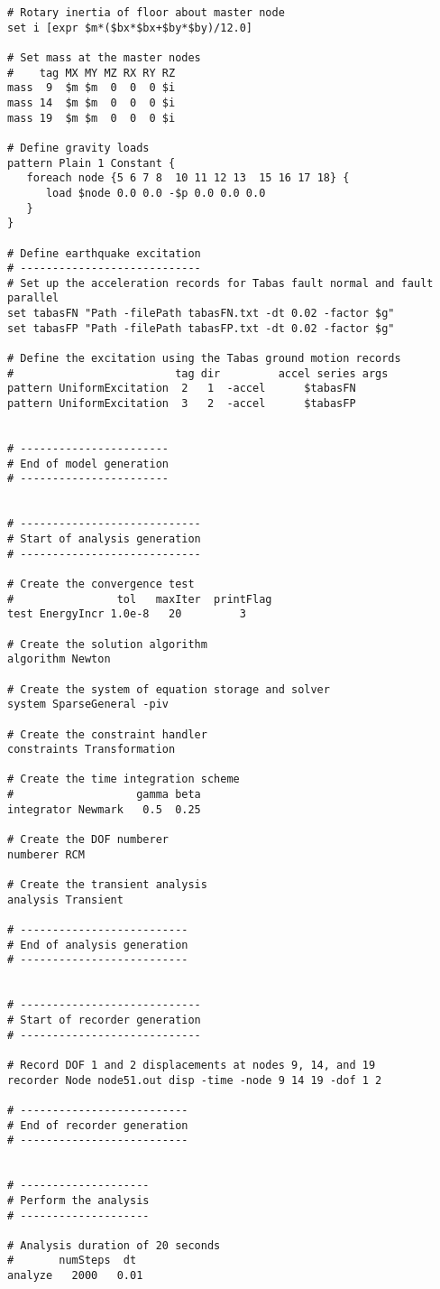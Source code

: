\documentclass[12pt]{article}
\begin{document}
{\begin{verbatim}
# Rotary inertia of floor about master node
set i [expr $m*($bx*$bx+$by*$by)/12.0]

# Set mass at the master nodes
#    tag MX MY MZ RX RY RZ
mass  9  $m $m  0  0  0 $i
mass 14  $m $m  0  0  0 $i
mass 19  $m $m  0  0  0 $i

# Define gravity loads
pattern Plain 1 Constant {
   foreach node {5 6 7 8  10 11 12 13  15 16 17 18} {
      load $node 0.0 0.0 -$p 0.0 0.0 0.0
   }
}

# Define earthquake excitation
# ----------------------------
# Set up the acceleration records for Tabas fault normal and fault parallel
set tabasFN "Path -filePath tabasFN.txt -dt 0.02 -factor $g"
set tabasFP "Path -filePath tabasFP.txt -dt 0.02 -factor $g"

# Define the excitation using the Tabas ground motion records
#                         tag dir         accel series args
pattern UniformExcitation  2   1  -accel      $tabasFN
pattern UniformExcitation  3   2  -accel      $tabasFP


# ----------------------- 
# End of model generation
# -----------------------


# ----------------------------
# Start of analysis generation
# ----------------------------

# Create the convergence test
#                tol   maxIter  printFlag
test EnergyIncr 1.0e-8   20         3

# Create the solution algorithm
algorithm Newton

# Create the system of equation storage and solver
system SparseGeneral -piv

# Create the constraint handler
constraints Transformation

# Create the time integration scheme
#                   gamma beta
integrator Newmark   0.5  0.25

# Create the DOF numberer
numberer RCM

# Create the transient analysis
analysis Transient

# --------------------------
# End of analysis generation
# --------------------------


# ----------------------------
# Start of recorder generation
# ----------------------------

# Record DOF 1 and 2 displacements at nodes 9, 14, and 19
recorder Node node51.out disp -time -node 9 14 19 -dof 1 2

# --------------------------
# End of recorder generation
# --------------------------


# --------------------
# Perform the analysis
# --------------------

# Analysis duration of 20 seconds
#       numSteps  dt
analyze   2000   0.01
\end{verbatim}
}
\end{document}
